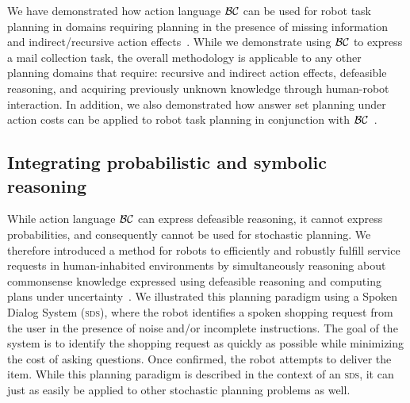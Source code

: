 We have demonstrated how action language ${\cal BC}$ can be used for
robot task planning in domains requiring planning in the presence of
missing information and indirect/recursive action
effects~\cite{khandelwal2014planning}. While we demonstrate using
${\cal BC}$ to express a mail collection task, the overall methodology
is applicable to any other planning domains that require: recursive
and indirect action effects, defeasible reasoning, and acquiring
previously unknown knowledge through human-robot interaction. In
addition, we also demonstrated how answer set planning under action
costs \cite{eiter2003answer} can be applied to robot task planning in
conjunction with ${\cal BC}$~\cite{khandelwal2014planning}.


\subsection{Integrating probabilistic and symbolic reasoning}
While action
language ${\cal BC}$ can express defeasible reasoning, it cannot
express probabilities, and consequently cannot be used for stochastic
planning.  We therefore introduced a method for robots to efficiently
and robustly fulfill service requests in human-inhabited environments
by simultaneously reasoning about commonsense knowledge expressed
using defeasible reasoning and computing plans under
uncertainty~\cite{zhang2015corpp}.  We illustrated this planning
paradigm using a Spoken Dialog System (\textsc{sds}), where the robot
identifies a spoken shopping request from the user in the presence of
noise and/or incomplete instructions.  The goal of the system is to
identify the shopping request as quickly as possible while minimizing
the cost of asking questions.  Once confirmed, the robot attempts to
deliver the item.  While this planning paradigm is described in the
context of an \textsc{sds}, it can just as easily be applied to other
stochastic planning problems as well.

